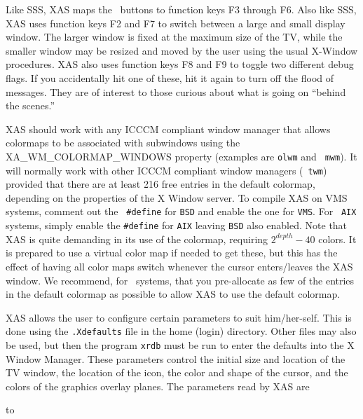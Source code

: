 Like SSS, XAS maps the \AIPS\ buttons to function keys F3 through F6.
Also like SSS, XAS uses function keys F2 and F7 to switch between a
large and small display window.  The larger window is fixed at the
maximum size of the TV, while the smaller window may be resized and
moved by the user using the usual X-Window procedures.  XAS also uses
function keys F8 and F9 to toggle two different debug flags.  If you
accidentally hit one of these, hit it again to turn off the flood of
messages.  They are of interest to those curious about what is going
on ``behind the scenes.''

XAS should work with any ICCCM compliant window manager that allows
colormaps to be associated with subwindows using the
XA\_WM\_COLORMAP\_WINDOWS property (examples are {\tt olwm} and {\tt
mwm}).  It will normally work with other ICCCM compliant window
managers (\eg\ {\tt twm}) provided that there are at least 216 free
entries in the default colormap, depending on the properties of the X
Window server.  To compile XAS on VMS systems, comment out the {\tt
\#define} for {\tt BSD} and enable the one for {\tt VMS}.  For {\tt
AIX} systems, simply enable the {\tt \#define} for {\tt AIX} leaving
{\tt BSD} also enabled.  Note that XAS is quite demanding in its use
of the colormap, requiring $2^{depth} - 40$ colors.  It is prepared to
use a virtual color map if needed to get these, but this has the
effect of having all color maps switch whenever the cursor
enters/leaves the XAS window.  We recommend, for \AIPS\ systems, that
you pre-allocate as few of the entries in the default colormap as
possible to allow XAS to use the default colormap.

XAS allows the user to configure certain parameters to suit
him/her-self.  This is done using the {\tt .Xdefaults} file in the
home (login) directory.  Other files may also be used, but then the
program {\tt xrdb} must be run to enter the defaults into the X Window
Manager.  These parameters control the initial size and location of
the TV window, the location of the icon, the color and shape of the
cursor, and the colors of the graphics overlay planes.  The parameters
read by XAS are

\hbox to 

